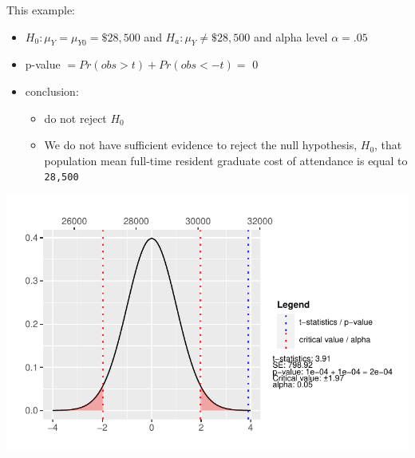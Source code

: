\documentclass[
  letterpaper,
  DIV=11,
  numbers=noendperiod]{scrartcl}
\newenvironment{Shaded}{\begin{snugshade}}{\end{snugshade}}
\newcommand{\AttributeTok}[1]{\textcolor[rgb]{0.40,0.45,0.13}{#1}}
\newcommand{\ConstantTok}[1]{\textcolor[rgb]{0.56,0.35,0.01}{#1}}
\newcommand{\DecValTok}[1]{\textcolor[rgb]{0.68,0.00,0.00}{#1}}
\newcommand{\FunctionTok}[1]{\textcolor[rgb]{0.28,0.35,0.67}{#1}}
\newcommand{\NormalTok}[1]{\textcolor[rgb]{0.00,0.23,0.31}{#1}}
\newcommand{\SpecialCharTok}[1]{\textcolor[rgb]{0.37,0.37,0.37}{#1}}
\providecommand{\tightlist}{%
  \setlength{\itemsep}{0pt}\setlength{\parskip}{0pt}}\usepackage{longtable,booktabs,array}
\begin{document}
This example:

\begin{itemize}
\tightlist
\item
  \(H_0: \mu_Y = \mu_{Y0} = \$28,500\) and \(H_a: \mu_Y \ne \$28,500\)
  and alpha level \(\alpha = .05\)
\item
  p-value \(= Pr(obs > t) + Pr(obs< -t) =\) 0
\item
  conclusion:

  \begin{itemize}
  \tightlist
  \item
    do not reject \(H_0\)
  \item
    We do not have sufficient evidence to reject the null hypothesis,
    \(H_0\), that population mean full-time resident graduate cost of
    attendance is equal to \texttt{28,500}
  \end{itemize}
\end{itemize}

\begin{Shaded}
\end{Shaded}

\includegraphics{SSS_5.1-Lecture_files/figure-pdf/unnamed-chunk-15-1.pdf}
\end{document}
